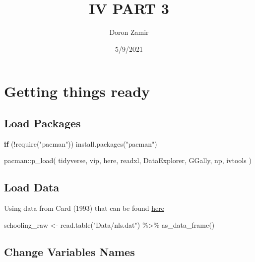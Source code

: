 \documentclass[
]{article}
\title{IV PART 3}
\author{Doron Zamir}
\date{5/9/2021}
\newenvironment{Shaded}{\begin{snugshade}}{\end{snugshade}}
\newcommand{\ControlFlowTok}[1]{\textcolor[rgb]{0.13,0.29,0.53}{\textbf{#1}}}
\newcommand{\FunctionTok}[1]{\textcolor[rgb]{0.00,0.00,0.00}{#1}}
\newcommand{\NormalTok}[1]{#1}
\newcommand{\OtherTok}[1]{\textcolor[rgb]{0.56,0.35,0.01}{#1}}
\newcommand{\SpecialCharTok}[1]{\textcolor[rgb]{0.00,0.00,0.00}{#1}}
\newcommand{\StringTok}[1]{\textcolor[rgb]{0.31,0.60,0.02}{#1}}
\begin{document}
\maketitle

\hypertarget{getting-things-ready}{%
\section{Getting things ready}\label{getting-things-ready}}

\hypertarget{load-packages}{%
\subsection{Load Packages}\label{load-packages}}

\begin{Shaded}
\begin{Highlighting}[]
\ControlFlowTok{if}\NormalTok{ (}\SpecialCharTok{!}\FunctionTok{require}\NormalTok{(}\StringTok{"pacman"}\NormalTok{)) }\FunctionTok{install.packages}\NormalTok{(}\StringTok{"pacman"}\NormalTok{)}

\NormalTok{pacman}\SpecialCharTok{::}\FunctionTok{p\_load}\NormalTok{(}
\NormalTok{  tidyverse,}
\NormalTok{  vip,}
\NormalTok{  here,}
\NormalTok{  readxl,}
\NormalTok{  DataExplorer,}
\NormalTok{  GGally,}
\NormalTok{  np,}
\NormalTok{  ivtools}
\NormalTok{)}
\end{Highlighting}
\end{Shaded}

\hypertarget{load-data}{%
\subsection{Load Data}\label{load-data}}

Using data from Card (1993) that can be found
\href{https://davidcard.berkeley.edu/data_sets.html}{here}

\begin{Shaded}
\begin{Highlighting}[]
\NormalTok{schooling\_raw }\OtherTok{\textless{}{-}} \FunctionTok{read.table}\NormalTok{(}\StringTok{"Data/nls.dat"}\NormalTok{) }\SpecialCharTok{\%\textgreater{}\%}
  \FunctionTok{as\_data\_frame}\NormalTok{()}
\end{Highlighting}
\end{Shaded}

\hypertarget{change-variables-names}{%
\subsection{Change Variables Names}\label{change-variables-names}}
\end{document}
